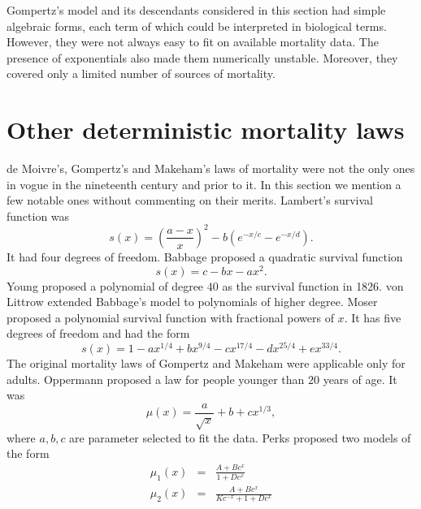 \documentclass{article}
\numberwithin{equation}{section}
\begin{document}
Gompertz's model and its descendants considered in this section had simple
algebraic forms, each term of which could be interpreted in biological
terms. However, they were not always easy to fit on available mortality
data. The presence of exponentials also made them numerically unstable. 
Moreover, they covered only a limited number of sources of mortality.

\section{Other deterministic mortality laws}\label{s4}
de Moivre's, Gompertz's and Makeham's laws of mortality were not the only
ones in vogue in the nineteenth century and prior to it. In this section we
mention a few notable ones without commenting on their merits. Lambert's
survival function \cite{lambert1776dottrina} was
\begin{equation}\label{s4e1}
s(x) = \left(\frac{a - x}{x}\right)^2 - b\left(e^{-x/c} - e^{-x/d}\right).
\end{equation}
It had four degrees of freedom. Babbage\cite{babbage1823tables} proposed a 
quadratic survival function
\begin{equation}\label{s4e2}
s(x) = c - bx - ax^2.
\end{equation}
Young proposed a polynomial of degree $40$ as the survival function in 
\cite{adler1866memoir} 1826. von Littrow\cite{von1832lebensversicherungen}
extended Babbage's model to polynomials of higher degree. Moser
\cite{moser1839gesetze} proposed a polynomial survival function with 
fractional powers of $x$. It has five degrees of freedom and had the form
\begin{equation}\label{s4e3}
s(x) = 1 - ax^{1/4} + bx^{9/4} - cx^{17/4} - dx^{25/4} + ex^{33/4}.
\end{equation}
The original mortality laws of Gompertz and Makeham were applicable only
for adults. Oppermann proposed \cite{oppermann1870graduation} a law for people 
younger than $20$ years of age. It was
\begin{equation}\label{s4e4}
\mu(x) = \frac{a}{\sqrt{x}} + b + cx^{1/3},
\end{equation}
where $a, b, c$ are parameter selected to fit the data. Perks 
\cite{perks1932some} proposed two models of the form
\begin{eqnarray}
\mu_1(x) &=& \frac{A + Bc^x}{1 + Dc^x} \label{s4e5} \\
\mu_2(x) &=& \frac{A + Bc^x}{Kc^{-x} + 1 + Dc^x} \label{s4e6}
\end{eqnarray}
\end{document}
